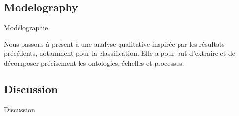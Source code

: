 \subsection{Modelography}{Modélographie}


Nous passons à présent à une analyse qualitative inspirée par les résultats précédents, notamment pour la classification. Elle a pour but d'extraire et de décomposer précisément les ontologies, échelles et processus.














\subsection{Discussion}{Discussion}






